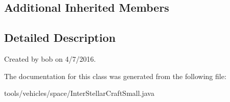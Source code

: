 \subsection*{Additional Inherited Members}


\subsection{Detailed Description}
Created by bob on 4/7/2016. 

The documentation for this class was generated from the following file\+:\begin{DoxyCompactItemize}
\item 
tools/vehicles/space/Inter\+Stellar\+Craft\+Small.\+java\end{DoxyCompactItemize}

